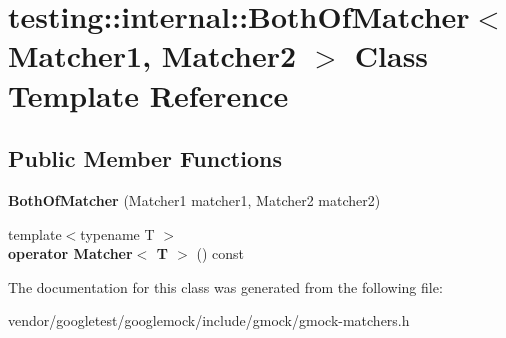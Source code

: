 \hypertarget{classtesting_1_1internal_1_1BothOfMatcher}{}\section{testing\+:\+:internal\+:\+:Both\+Of\+Matcher$<$ Matcher1, Matcher2 $>$ Class Template Reference}
\label{classtesting_1_1internal_1_1BothOfMatcher}
\subsection*{Public Member Functions}
\begin{DoxyCompactItemize}
\item 
{\bfseries Both\+Of\+Matcher} (Matcher1 matcher1, Matcher2 matcher2)\hypertarget{classtesting_1_1internal_1_1BothOfMatcher_ab7941deda1965521f72d58b0dd429d6a}{}\label{classtesting_1_1internal_1_1BothOfMatcher_ab7941deda1965521f72d58b0dd429d6a}

\item 
{\footnotesize template$<$typename T $>$ }\\{\bfseries operator Matcher$<$ T $>$} () const \hypertarget{classtesting_1_1internal_1_1BothOfMatcher_aac6e941d3c89462183f24b974d4d7ca8}{}\label{classtesting_1_1internal_1_1BothOfMatcher_aac6e941d3c89462183f24b974d4d7ca8}

\end{DoxyCompactItemize}


The documentation for this class was generated from the following file\+:\begin{DoxyCompactItemize}
\item 
vendor/googletest/googlemock/include/gmock/gmock-\/matchers.\+h\end{DoxyCompactItemize}

